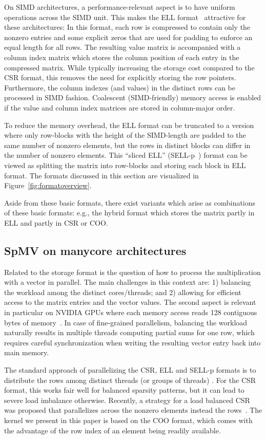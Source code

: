 On SIMD architectures, a performance-relevant aspect is to have uniform operations
across the SIMD unit. This makes the ELL format~\cite{ellpack} attractive for these architectures:
In this format, each row is compressed to contain only the nonzero entries 
and some explicit zeros that are used for padding to enforce
an equal length for all rows.
The resulting value matrix is accompanied with a column index matrix which stores
the column position of each entry in the compressed matrix.
While typically increasing the storage cost compared to the CSR format,
this removes the need for explicitly storing the row pointers.
Furthermore, the column indexes (and values) in the distinct
rows can be processed in SIMD fashion.
Coalescent (SIMD-friendly) memory access is enabled if the value and column
index matrices are stored in column-major order.

To reduce the memory overhead, the ELL format can be truncated to a version
where only row-blocks with the height of the SIMD-length are padded to the
same number of nonzero elements, but the rows in distinct blocks can differ in
the number of nonzero elements.
This ``sliced ELL'' (SELL-p~\cite{sellcs}) format can be viewed as splitting the matrix into row-blocks
and storing each block in ELL format.
The formats discussed in this section are visualized
in Figure~\ref{fig:formatoverview}.

Aside from these basic formats, there exist variants
which arise as combinations of these basic formats:
e.g., the hybrid format which stores the matrix partly in ELL and partly in
CSR or COO.


\subsection{SpMV on manycore architectures}

Related to the storage format is the question of how to process
the multiplication with a vector in parallel.
The main challenges in this context are: 
1) balancing the workload among the distinct cores/threads; and 
2) allowing for efficient access to the matrix entries and the vector values.
The second aspect is relevant in particular on NVIDIA GPUs where each memory access
reads 128 contiguous bytes of memory~\cite{cuda8.0}.
In case of fine-grained parallelism, balancing the workload naturally results in 
multiple threads computing partial sums for one row, which requires careful synchronization
when writing the resulting vector entry back into main memory.

The standard approach of parallelizing the CSR, ELL and SELL-p formats is to
distribute the rows among distinct threads (or groups of threads)
\cite{ellpack, sellc}.
For the CSR format, this works fair well for balanced sparsity patterns, but it can lead to
severe load imbalance otherwise. 
Recently, a strategy for a load balanced CSR \spmv was proposed that 
parallelizes across the nonzero elements instead the rows~\cite{csri}. 
The \spmv kernel we present in this paper is based on the COO format, which 
comes with the advantage of the row index of an element being readily available.

